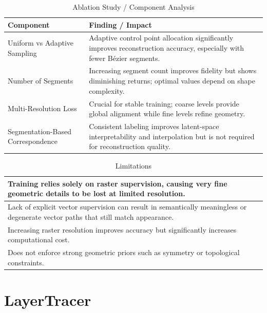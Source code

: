 \begin{table}[h!]
\centering
\caption{Ablation Study / Component Analysis}
\begin{tabular}{|l|p{10cm}|}
\hline
\textbf{Component} & \textbf{Finding / Impact} \\ \hline

Uniform vs Adaptive Sampling &
Adaptive control point allocation significantly improves reconstruction accuracy, especially with fewer Bézier segments. \\ \hline

Number of Segments &
Increasing segment count improves fidelity but shows diminishing returns; optimal values depend on shape complexity. \\ \hline

Multi-Resolution Loss &
Crucial for stable training; coarse levels provide global alignment while fine levels refine geometry. \\ \hline

Segmentation-Based Correspondence &
Consistent labeling improves latent-space interpretability and interpolation but is not required for reconstruction quality. \\ \hline

\end{tabular}
\end{table}


\begin{table}[h!]
\centering
\caption{Limitations}
\begin{tabular}{|p{14cm}|}
\hline
Training relies solely on raster supervision, causing very fine geometric details to be lost at limited resolution. \\ \hline
Lack of explicit vector supervision can result in semantically meaningless or degenerate vector paths that still match appearance. \\ \hline
Increasing raster resolution improves accuracy but significantly increases computational cost. \\ \hline
Does not enforce strong geometric priors such as symmetry or topological constraints. \\ \hline
\end{tabular}
\end{table}



\chapter{LayerTracer}

